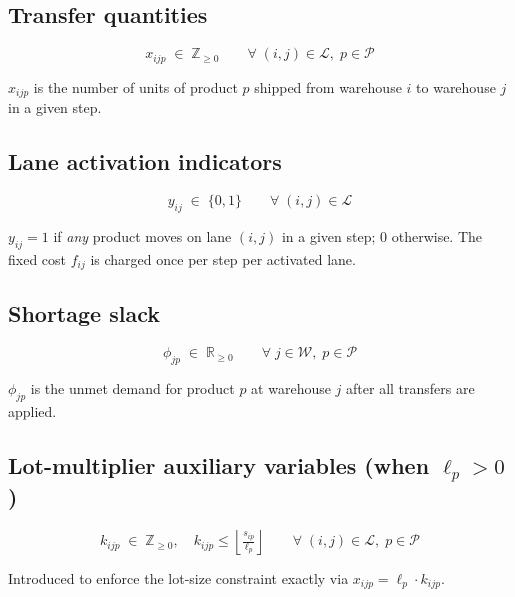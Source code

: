 \documentclass[11pt, a4paper]{article}
\begin{document}
\subsection{Transfer quantities}

\begin{equation}
  x_{ijp} \;\in\; \mathbb{Z}_{\geq 0}
  \qquad \forall\; (i,j) \in \mathcal{L},\; p \in \mathcal{P}
\end{equation}

$x_{ijp}$ is the number of units of product $p$ shipped from warehouse
$i$ to warehouse $j$ in a given step.

\subsection{Lane activation indicators}

\begin{equation}
  y_{ij} \;\in\; \{0, 1\}
  \qquad \forall\; (i,j) \in \mathcal{L}
\end{equation}

$y_{ij} = 1$ if \emph{any} product moves on lane $(i,j)$ in a given
step; $0$ otherwise.  The fixed cost $f_{ij}$ is charged once per step
per activated lane.

\subsection{Shortage slack}

\begin{equation}
  \phi_{jp} \;\in\; \mathbb{R}_{\geq 0}
  \qquad \forall\; j \in \mathcal{W},\; p \in \mathcal{P}
\end{equation}

$\phi_{jp}$ is the unmet demand for product $p$ at warehouse $j$ after
all transfers are applied.

\subsection{Lot-multiplier auxiliary variables (when $\ell_p > 0$)}

\begin{equation}
  k_{ijp} \;\in\; \mathbb{Z}_{\geq 0},
  \quad k_{ijp} \leq \left\lfloor \tfrac{s_{ip}}{\ell_p} \right\rfloor
  \qquad \forall\; (i,j) \in \mathcal{L},\; p \in \mathcal{P}
\end{equation}

Introduced to enforce the lot-size constraint exactly via
$x_{ijp} = \ell_p \cdot k_{ijp}$.
\end{document}
